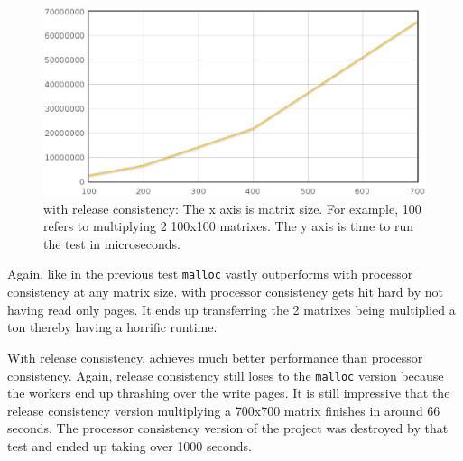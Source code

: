 \begin{figure}[!h]
\centering
\includegraphics[scale=0.40]{images/mmlh-fixed-threads.eps}
\caption{\projname{} with release consistency: The x axis is matrix size. For example, 100 refers to multiplying 2 100x100 matrixes. The y axis is time to run the test in microseconds.}
\end{figure}

Again, like in the previous test \verb,malloc, vastly outperforms \projname{} with processor consistency at any matrix size. \projname{} with processor consistency gets hit hard by not having read only pages. It ends up transferring the 2 matrixes being multiplied a ton thereby having a horrific runtime.

With release consistency, \projname{} achieves much better performance than processor consistency. Again, release consistency still loses to the \verb,malloc, version because the workers end up thrashing over the write pages. It is still impressive that the release consistency version multiplying a 700x700 matrix finishes in around 66 seconds. The processor consistency version of the project was destroyed by that test and ended up taking over 1000 seconds.
